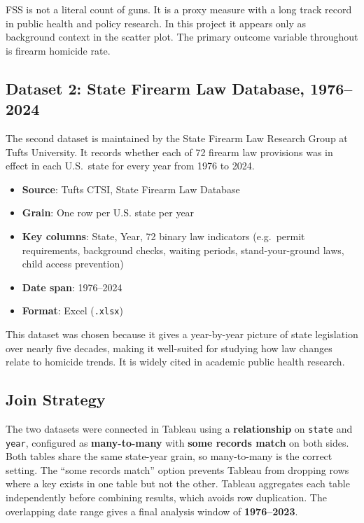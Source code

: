 \documentclass[a4paper,11pt]{article}
\begin{document}
\par
FSS is not a literal count of guns. It is a proxy measure with a long track
record in public health and policy research\autocite{extendingfss}. In this
project it appears only as background context in the scatter plot. The primary
outcome variable throughout is firearm homicide rate.

\subsection{Dataset 2: State Firearm Law Database, 1976--2024}

\par
The second dataset\autocite{statefirearmlaw} is maintained by the State
Firearm Law Research Group at Tufts University. It records whether each of 72
firearm law provisions was in effect in each U.S.\ state for every year from
1976 to 2024.

\begin{itemize}
	\item \textbf{Source}: Tufts CTSI, State Firearm Law Database\autocite{statefirearmlaw}
	\item \textbf{Grain}: One row per U.S. state per year
	\item \textbf{Key columns}: State, Year, 72 binary law indicators
	      (e.g.\ permit requirements, background checks, waiting periods,
	      stand-your-ground laws, child access prevention)
	\item \textbf{Date span}: 1976--2024
	\item \textbf{Format}: Excel (\texttt{.xlsx})
\end{itemize}

\par
This dataset was chosen because it gives a year-by-year picture of state
legislation over nearly five decades, making it well-suited for studying how
law changes relate to homicide trends. It is widely cited in academic public
health research\autocite{statefirearmlaw}.

\subsection{Join Strategy}

\par
The two datasets were connected in Tableau using a \textbf{relationship} on
\texttt{state} and \texttt{year}, configured as \textbf{many-to-many} with
\textbf{some records match} on both sides. Both tables share the same
state-year grain, so many-to-many is the correct setting. The ``some records
match'' option prevents Tableau from dropping rows where a key exists in one
table but not the other. Tableau aggregates each table independently before
combining results, which avoids row duplication. The overlapping date range
gives a final analysis window of \textbf{1976--2023}.
\end{document}

